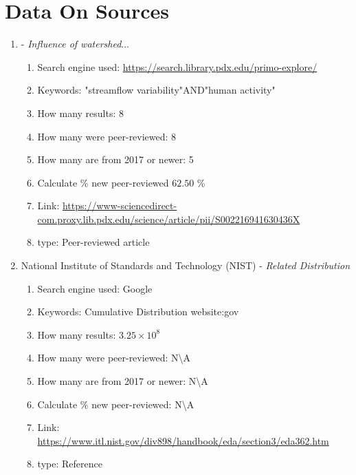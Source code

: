 \documentclass[a4paper,man,biblatex]{apa7}
\begin{document}
\printbibliography

\appendix
\section{Data On Sources}
\label{appendix:data_on_source}

\begin{enumerate}

    \item \textcite{rice_2016} - \textit{Influence of watershed}...
        \begin{enumerate}
            \item Search engine used: \url{https://search.library.pdx.edu/primo-explore/}
            \item Keywords: "streamflow variability"AND"human activity"
            \item How many results: 8 
            \item How many were peer-reviewed: 8
            \item How many are from 2017 or newer: 5
            \item Calculate \% new peer-reviewed $62.50$  \%
            \item Link: \url{https://www-sciencedirect-com.proxy.lib.pdx.edu/science/article/pii/S002216941630436X}
            \item type: Peer-reviewed article
        \end{enumerate}

    \item National Institute of Standards and Technology (NIST) - \textit{Related Distribution}
        \begin{enumerate}
            \item Search engine used: Google
            \item Keywords: Cumulative Distribution website:gov
            \item How many results: $3.25\times 10^8$
            \item How many were peer-reviewed:  N\textbackslash A
            \item How many are from 2017 or newer: N\textbackslash A
            \item Calculate \% new peer-reviewed: N\textbackslash A 
            \item Link: \url{https://www.itl.nist.gov/div898/handbook/eda/section3/eda362.htm}
            \item type: Reference 
        \end{enumerate}


\end{enumerate}
\end{document}
